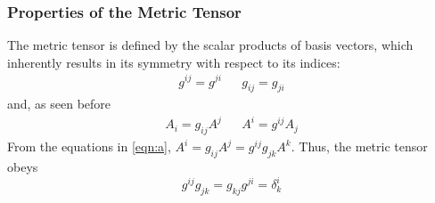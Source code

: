 \subsubsection{Properties of the Metric Tensor}
The metric tensor is defined by the scalar products of basis vectors, which inherently results in its symmetry with respect to its indices:
\begin{align}
g^{ij}=g^{ji} && g_{ij}=g_{ji}
\end{align}
and, as seen before
\begin{align}
\label{eqn:a}
A_i=g_{ij}A^j && A^i=g^{ij}A_j
\end{align}
From the equations in \eqref{eqn:a}, $A^i=g_{ij}A^j=g^{ij}g_{jk}A^k$. Thus, the metric tensor obeys
\begin{equation}
g^{ij}g_{jk}=g_{kj}g^{ji}=\delta^i_k
\end{equation}
